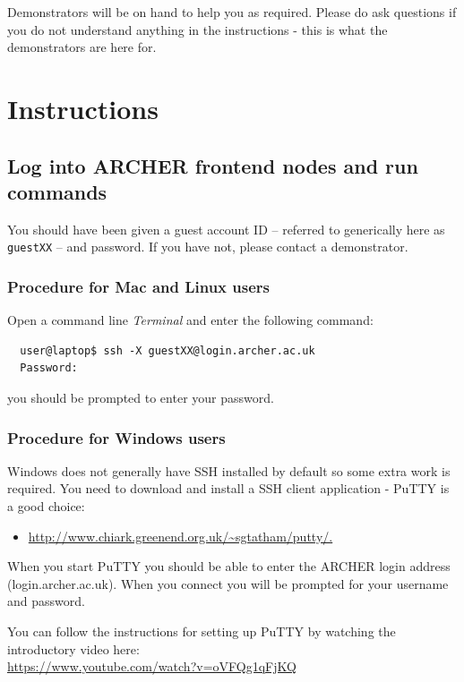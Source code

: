 \documentclass{article}
\begin{document}
Demonstrators will be on hand to help you as required. Please
do ask questions if you do not understand anything in the 
instructions - this is what the demonstrators are here for.
\section{Instructions}
\label{sec-3}
\subsection{Log into ARCHER frontend nodes and run commands}
\label{sec-3-1}


You should have been given a guest account ID -- referred to
generically here as \verb+guestXX+ -- and password. If you have not,
please contact a demonstrator.

\subsubsection{Procedure for Mac and Linux users}
\label{sec-3-1-1}


Open a command line \emph{Terminal} and enter the following command:


\begin{verbatim}
  user@laptop$ ssh -X guestXX@login.archer.ac.uk
  Password:
\end{verbatim}

you should be prompted to enter your password.
\subsubsection{Procedure for Windows users}
\label{sec-3-1-2}

Windows does not generally have SSH installed by default so some extra
work is required. You need to download and install a SSH client
application - PuTTY is a good choice:

\begin{itemize}
\item \href{http://www.chiark.greenend.org.uk/~sgtatham/putty/}{http://www.chiark.greenend.org.uk/\textasciitilde sgtatham/putty/.}
\end{itemize}

When you start PuTTY you should be able to enter the ARCHER login
address (login.archer.ac.uk). When you connect you will be prompted
for your username and password.

You can follow the instructions for setting up PuTTY by watching the
introductory video
here:\\ \href{https://www.youtube.com/watch?v=oVFQg1qFjKQ}{https://www.youtube.com/watch?v=oVFQg1qFjKQ}
\end{document}
